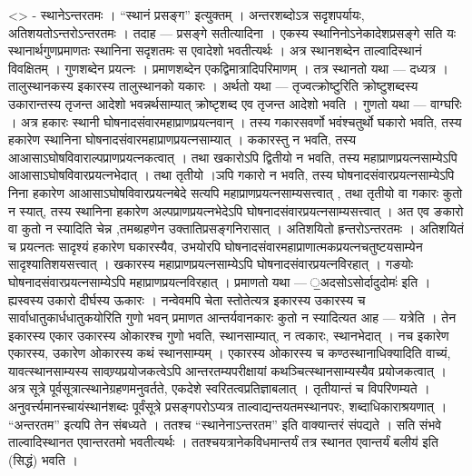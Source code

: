 \textless{}\textgreater{} - स्थानेऽन्तरतमः । ``स्थानं प्रसङ्ग''
इत्युक्तम् । अन्तरशब्दोऽत्र सदृशपर्यायः, अतिशयतोऽन्तरोऽन्तरतमः । तदाह
--- प्रसङ्गे सतीत्यादिना । एकस्य स्थानिनोऽनेकादेशप्रसङ्गे सति यः
स्थानार्थगुणप्रमाणतः स्थानिना सदृशतमः स एवादेशो भवतीत्यर्थः । अत्र
स्थानशब्देन ताल्वादिस्थानं विवक्षितम् । गुणशब्देन प्रयत्नः ।
प्रमाणशब्देन एकद्विमात्रादिपरिमाणम् । तत्र स्थानतो यथा --- दध्यत्र ।
तालुस्थानकस्य इकारस्य तालुस्थानको यकारः । अर्थतो यथा ---
तृज्वत्क्रोष्टुरिति क्रोष्टुशब्दस्य उकारान्तस्य तृजन्त आदेशो
भवन्नर्थसाम्यात् क्रोष्टृशब्द एव तृजन्त आदेशो भवति । गुणतो यथा ---
वाग्घरिः । अत्र हकारः स्थानी घोषनादसंवारमहाप्राणप्रयत्नवान् । तस्य
गकारसवर्णो भवंश्चतुर्थो घकारो भवति, तस्य हकारेण स्थानिना
घोषनादसंवारमहाप्राणप्रयत्नसाम्यात् । ककारस्तु न भवति, तस्य
आआसाऽघोषविवाराल्पप्राणप्रयत्नकत्वात् । तथा खकारोऽपि द्वितीयो न भवति,
तस्य महाप्राणप्रयत्नसाम्येऽपि आआसाऽघोषविवारप्रयत्नभेदात् । तथा तृतीयो
।ञपि गकारो न भवति, तस्य घोषनादसंवारप्रयत्नसाम्येऽपि निना हकारेण
आआसाऽघोषविवारप्रयत्नबेदे सत्यपि महाप्राणप्रयत्नसाम्यसत्त्वात् , तथा
तृतीयो वा गकारः कुतो न स्यात्, तस्य स्थानिना हकारेण
अल्पप्राणप्रयत्नभेदेऽपि घोषनादसंवारप्रयत्नसाम्यसत्त्वात् । अत एव ङकारो
वा कुतो न स्यादिति चेन्न ,तमब्ग्रहणेन उक्तातिप्रसङ्गनिरासात् । अतिशयितो
ह्रन्तरोऽन्तरतमः । अतिशयितं च प्रयत्नतः सादृश्यं हकारेण घकारस्यैव,
उभयोरपि घोषनादसंवारमहाप्राणात्मकप्रयत्नचतुष्टयसाम्येन
सादृश्यातिशयसत्त्वात् । खकारस्य महाप्राणप्रयत्नसाम्येऽपि
घोषनादसंवारप्रयत्नविरहात् । गङयोः घोषनादसंवारप्रयत्नसाम्येऽपि
महाप्राणप्रयत्नविरहात् । प्रमाणतो यथा --- ॒अदसोऽसोर्दादुदोमः॑ इति ।
ह्यस्वस्य उकारो दीर्घस्य ऊकारः । नन्वेवमपि चेता स्तोतेत्यत्र इकारस्य
उकारस्य च सार्वाधातुकार्धधातुकयोरिति गुणो भवन् प्रमाणत आन्तर्यवानकारः
कुतो न स्यादित्यत आह --- यत्रेति । तेन इकारस्य एकार उकारस्य ओकारश्च गुणो
भवति, स्थानसाम्यात्, न त्वकारः, स्थानभेदात् । नच इकारेण एकारस्य, उकारेण
ओकारस्य कथं स्थानसाम्यम् । एकारस्य ओकारस्य च कण्ठस्थानाधिक्यादिति
वाच्यं, यावत्स्थानसाम्यस्य सावण्र्यप्रयोजकत्वेऽपि आन्तरतम्यपरीक्षायां
कथञ्चित्स्थानसाम्यस्यैव प्रयोजकत्वात् । अत्र सूत्रे
पूर्वसूत्रात्स्थानेग्रहणमनुवर्तते, एकदेशे स्वरितत्वप्रतिज्ञाबलात् ।
तृतीयान्तं च विपरिणम्यते । अनुवर्त्त्यमानस्चायंस्थान॑शब्दः पूर्वंसूत्रे
प्रसङ्गपरोऽप्यत्र ताल्वाद्यन्तयतमस्थानपरः, शब्दाधिकाराश्रयणात् ।
``अन्तरतम'' इत्यपि तेन संबध्यते । ततश्च ``स्थानेनाऽन्तरतम'' इति
वाक्यान्तरं संपद्यते । सति संभवे ताल्वादिस्थानत एवान्तरतमो भवतीत्यर्थः ।
ततश्चयत्रानेकविधमान्तर्यं तत्र स्थानत एवान्तर्यं बलीय॑ इति (सिद्धं) भवति
।
